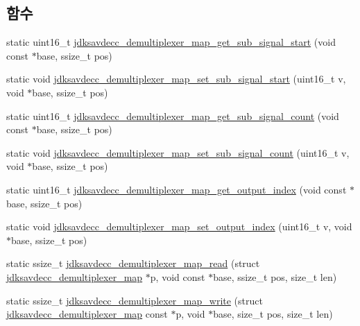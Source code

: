 \subsection*{함수}
\begin{DoxyCompactItemize}
\item 
static uint16\+\_\+t \hyperlink{group__demultiplexer__map_gaeac54a26ea375cbe0d5b2b8a123bb6a1}{jdksavdecc\+\_\+demultiplexer\+\_\+map\+\_\+get\+\_\+sub\+\_\+signal\+\_\+start} (void const $\ast$base, ssize\+\_\+t pos)
\item 
static void \hyperlink{group__demultiplexer__map_ga31252ba4bc4b0624e0c4a9a4d349cccb}{jdksavdecc\+\_\+demultiplexer\+\_\+map\+\_\+set\+\_\+sub\+\_\+signal\+\_\+start} (uint16\+\_\+t v, void $\ast$base, ssize\+\_\+t pos)
\item 
static uint16\+\_\+t \hyperlink{group__demultiplexer__map_gaaf0bb4a7ccfc5d5a2ae4cac02e854d8d}{jdksavdecc\+\_\+demultiplexer\+\_\+map\+\_\+get\+\_\+sub\+\_\+signal\+\_\+count} (void const $\ast$base, ssize\+\_\+t pos)
\item 
static void \hyperlink{group__demultiplexer__map_ga9946190d8c02ce5b5a74cafffa57af81}{jdksavdecc\+\_\+demultiplexer\+\_\+map\+\_\+set\+\_\+sub\+\_\+signal\+\_\+count} (uint16\+\_\+t v, void $\ast$base, ssize\+\_\+t pos)
\item 
static uint16\+\_\+t \hyperlink{group__demultiplexer__map_ga5a25655bd8dedb611c9be23190fee7ff}{jdksavdecc\+\_\+demultiplexer\+\_\+map\+\_\+get\+\_\+output\+\_\+index} (void const $\ast$base, ssize\+\_\+t pos)
\item 
static void \hyperlink{group__demultiplexer__map_gadd33cdf074089b5421b0a3ef1d4656cb}{jdksavdecc\+\_\+demultiplexer\+\_\+map\+\_\+set\+\_\+output\+\_\+index} (uint16\+\_\+t v, void $\ast$base, ssize\+\_\+t pos)
\item 
static ssize\+\_\+t \hyperlink{group__demultiplexer__map_ga6f5a30b4c818f66d9279171a54ec2307}{jdksavdecc\+\_\+demultiplexer\+\_\+map\+\_\+read} (struct \hyperlink{structjdksavdecc__demultiplexer__map}{jdksavdecc\+\_\+demultiplexer\+\_\+map} $\ast$p, void const $\ast$base, ssize\+\_\+t pos, size\+\_\+t len)
\item 
static ssize\+\_\+t \hyperlink{group__demultiplexer__map_ga6aa945f9a3dabf8c5eab61670f7c4f12}{jdksavdecc\+\_\+demultiplexer\+\_\+map\+\_\+write} (struct \hyperlink{structjdksavdecc__demultiplexer__map}{jdksavdecc\+\_\+demultiplexer\+\_\+map} const $\ast$p, void $\ast$base, size\+\_\+t pos, size\+\_\+t len)
\end{DoxyCompactItemize}


